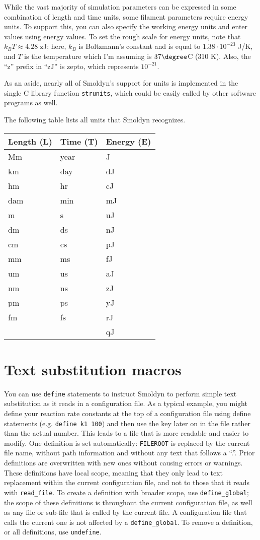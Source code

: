 \documentclass {scrbook}
\newcommand {\ttt} {\texttt}
\begin{document}
While the vast majority of simulation parameters can be expressed in some combination of length and time units, some filament parameters require energy units. To support this, you can also specify the working energy units and enter values using energy values. To set the rough scale for energy units, note that $k_B T \approx 4.28$ zJ; here, $k_B$ is Boltzmann's constant and is equal to $1.38\cdot10^{-23}$ J/K, and $T$ is the temperature which I'm assuming is $37\degree$C (310 K). Also, the ``z'' prefix in ``zJ'' is zepto, which represents $10^{-21}$.

As an aside, nearly all of Smoldyn's support for units is implemented in the single C library function \ttt{strunits}, which could be easily called by other software programs as well.

The following table lists all units that Smoldyn recognizes.

\begin{longtable}[c]{lll}
Length (L) & Time (T) & Energy (E) \\
\hline
Mm & year & J \\
km & day & dJ \\
hm & hr & cJ \\
dam & min & mJ \\
m & s & uJ \\
dm & ds & nJ \\
cm & cs & pJ \\
mm & ms & fJ \\
um & us & aJ \\
nm & ns & zJ \\
pm & ps & yJ \\
fm & fs & rJ \\
 & & qJ
\end{longtable}


\section{Text substitution macros}

You can use \ttt{define} statements to instruct Smoldyn to perform simple text substitution as it reads in a configuration file. As a typical example, you might define your reaction rate constants at the top of a configuration file using define statements (e.g. \ttt{define k1 100}) and then use the key later on in the file rather than the actual number. This leads to a file that is more readable and easier to modify. One definition is set automatically: \ttt{FILEROOT} is replaced by the current file name, without path information and without any text that follows a ``.''. Prior definitions are overwritten with new ones without causing errors or warnings. These definitions have local scope, meaning that they only lead to text replacement within the current configuration file, and not to those that it reads with \ttt{read\_file}. To create a definition with broader scope, use \ttt{define\_global}; the scope of these definitions is throughout the current configuration file, as well as any file or sub-file that is called by the current file. A configuration file that calls the current one is not affected by a \ttt{define\_global}. To remove a definition, or all definitions, use \ttt{undefine}.
\end{document}
